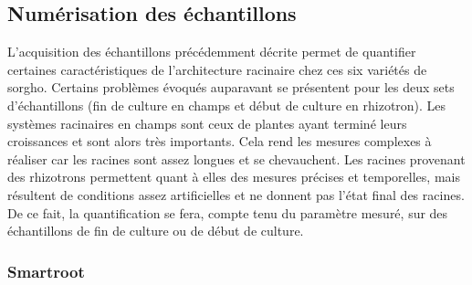 \subsection{Numérisation des échantillons}
L'acquisition des échantillons précédemment décrite permet de quantifier certaines caractéristiques de l'architecture racinaire chez ces six variétés de sorgho.
Certains problèmes évoqués auparavant se présentent pour les deux sets d'échantillons (fin de culture en champs et début de culture en rhizotron).
Les systèmes racinaires en champs sont ceux de plantes ayant terminé leurs croissances et sont alors très importants.
Cela rend les mesures complexes à réaliser car les racines sont assez longues et se chevauchent.
Les racines provenant des rhizotrons permettent quant à elles des mesures précises et temporelles, mais résultent de conditions assez artificielles et ne donnent pas l'état final des racines.
De ce fait, la quantification se fera, compte tenu du paramètre mesuré, sur des échantillons de fin de culture ou de début de culture.

\subsubsection{Smartroot}

